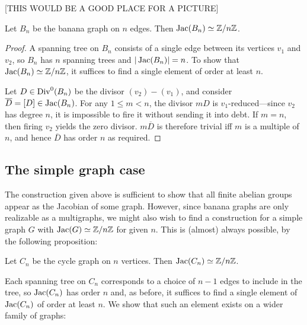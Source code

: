 \documentclass{amsart}
\begin{document}
[THIS WOULD BE A GOOD PLACE FOR A PICTURE]

\begin{prop}
  \label{prop:banana_cyclic}
  Let $B_n$ be the banana graph on $n$ edges. Then $\operatorname{Jac}(B_n) \simeq \mathbb{Z}/n\mathbb{Z}$.
\end{prop}

\begin{proof}
  A spanning tree on $B_n$ consists of a single edge between its
  vertices $v_1$ and $v_2$, so $B_n$ has $n$ spanning trees and
  $|\operatorname{Jac}(B_n)| = n$. To show that $\operatorname{Jac}(B_n) \simeq \mathbb{Z}/n\mathbb{Z}$, it
  suffices to find a single element of order at least $n$.

  Let $D \in \operatorname{Div}^0(B_n)$ be the divisor $(v_2) - (v_1)$, and consider
  $\overline{D} = [D] \in \operatorname{Jac}(B_n)$. For any $1 \le m < n$, the
  divisor $mD$ is $v_1$-reduced---since $v_2$ has degree $n$, it is
  impossible to fire it without sending it into debt. If $m=n$, then
  firing $v_2$ yields the zero divisor. $m\overline{D}$ is therefore
  trivial iff $m$ is a multiple of $n$, and hence $\overline{D}$ has
  order $n$ as required.
\end{proof}

\subsection{The simple graph case}
The construction given above is sufficient to show that all finite
abelian groups appear as the Jacobian of some graph. However, since
banana graphs are only realizable as a multigraphs, we might also wish
to find a construction for a simple graph $G$ with $\operatorname{Jac}(G) \simeq
\mathbb{Z}/n\mathbb{Z}$ for given $n$. This is (almost) always possible, by the
following proposition:

\begin{prop}
  \label{prop:cycle_cyclic}
  Let $C_n$ be the cycle graph on $n$ vertices. Then $\operatorname{Jac}(C_n) \simeq
  \mathbb{Z}/n\mathbb{Z}$.
\end{prop}

Each spanning tree on $C_n$ corresponds to a choice of $n-1$ edges to
include in the tree, so $\operatorname{Jac}(C_n)$ has order $n$ and, as before, it
suffices to find a single element of $\operatorname{Jac}(C_n)$ of order at least
$n$. We show that such an element exists on a wider family of graphs:
\end{document}
